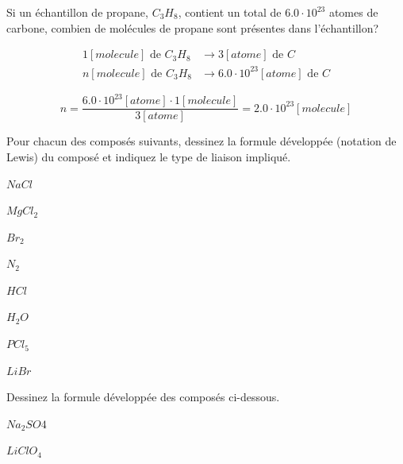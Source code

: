 \documentclass[
  11pt,
  a4paper,
  openany]{book}
\begin{document}
\begin{Exercise}

Si un échantillon de propane, \(C_3H_8\), contient un total de \(6.0 \cdot 10^{23}\) atomes de carbone, combien de molécules de propane sont présentes dans l'échantillon?


\end{Exercise}

\begin{Answer}
\[ \begin{split}
  1 [molecule] \text{ de } C_3H_8 & \longrightarrow 3 [atome] \text{ de }  C \\
  n [molecule] \text{ de } C_3H_8 & \longrightarrow 6.0 \cdot 10^{23} [atome] \text{ de } C
  \end{split} \]

\[ n = \frac{6.0 \cdot 10^{23} [atome] \cdot 1 [molecule]}{3 [atome]} = 2.0 \cdot 10^{23} [molecule] \]

\end{Answer}

\newpage

\begin{Exercise}

Pour chacun des composés suivants, dessinez la formule développée (notation de Lewis) du composé et indiquez le type de liaison impliqué.

\begin{multicols}{4}
\(NaCl\)

\(MgCl_2\)

\(Br_2\)

\(N_2\)

\end{multicols}


\begin{multicols}{4}
\(HCl\)

\(H_2O\)

\(PCl_5\)

\(LiBr\)

\end{multicols}


\end{Exercise}

\begin{Exercise}

Dessinez la formule développée des composés ci-dessous.

\begin{multicols}{2}
\(Na_2SO4\)

\(LiClO_4\)

\end{multicols}


\end{Exercise}
\end{document}
